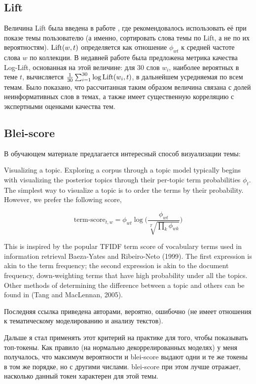 \subsection{Lift}
Величина Lift была введена в работе \cite{taddy2012estimation}, где рекомендовалось использовать её при показе темы пользователю (а именно, сортировать слова темы по Lift, а не по их вероятностям). $\textup{Lift}(w, t)$ определяется как отношение $\phi_{wt}$ к средней частоте слова $w$ по коллекции. В недавней работе \cite{fan2019assessing} была предложена метрика качества Log-Lift, основанная на этой величине: для 30 слов $w_i$, наиболее вероятных в теме $t$, вычисляется $\frac{1}{30}\sum_{i=1}^{30}\log \textup{Lift}(w_i, t)$, в дальнейшем усредняемая по всем темам. Было показано, что рассчитанная таким образом величина связана с долей неинформативных слов в темах, а также имеет существенную корреляцию с экспертными оценками качества тем.



\subsection{Blei-score}

В обучающем материале \cite{Blei_lafferty} предлагается интересный способ визуализации темы:

Visualizing a topic. Exploring a corpus through a topic model typically begins with visualizing the posterior topics through their per-topic
term probabilities $\phi_{t}$. The simplest way to visualize a topic is to order the
terms by their probability. However, we prefer the following score,

$$\text{term-score}_{t,w} = \phi_{wt} \log \bigg( \frac{\phi_{wt}}{\sqrt[T]{\prod_k \phi_{wk}}}\bigg)$$

This is inspired by the popular TFIDF term score of vocabulary terms used
in information retrieval Baeza-Yates and Ribeiro-Neto (1999). The first
expression is akin to the term frequency; the second expression is akin to
the document frequency, down-weighting terms that have high probability
under all the topics. Other methods of determining the difference between
a topic and others can be found in (Tang and MacLennan, 2005).

Последняя ссылка приведена авторами, вероятно, ошибочно (не имеет отношения к тематическому моделированию и анализу текстов).

Дальше я стал применять этот критерий на практике для того, чтобы показывать топ-токены. Как правило (на нормально декоррелированных моделях) у меня получалось, что максимум вероятности и blei-score выдают одни и те же токены в том же порядке, но с другими числами. blei-score при этом лучше отражает, насколько данный токен характерен для этой темы.

